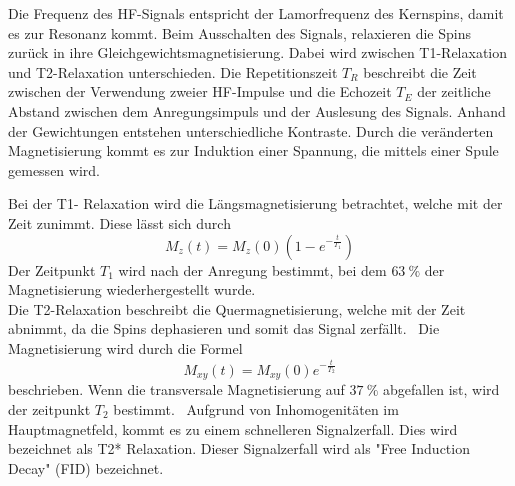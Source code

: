 Die Frequenz des HF-Signals entspricht der Lamorfrequenz des Kernspins, damit es zur Resonanz kommt. 
Beim Ausschalten des Signals, relaxieren die Spins zurück in ihre Gleichgewichtsmagnetisierung. 
Dabei wird zwischen T1-Relaxation und T2-Relaxation unterschieden. 
Die Repetitionszeit $T_R$ beschreibt die Zeit zwischen der Verwendung zweier HF-Impulse und die Echozeit $T_E$ der zeitliche Abstand zwischen dem Anregungsimpuls und der Auslesung des Signals. 
Anhand der Gewichtungen entstehen unterschiedliche Kontraste.
Durch die veränderten Magnetisierung kommt es zur Induktion einer Spannung, die mittels einer Spule gemessen wird.~\cite{Pollmann}

Bei der T1- Relaxation wird die Längsmagnetisierung betrachtet, welche mit der Zeit zunimmt.
Diese lässt sich durch 
\begin{equation}
    M_z(t) = M_z(0) (1 - e^{-\frac{t}{T_1}})
\end{equation}
Der Zeitpunkt $T_1$ wird nach der Anregung bestimmt, bei dem $\qty{63}{\%}$ der Magnetisierung wiederhergestellt wurde.~\cite{Pollmann}\\
Die T2-Relaxation beschreibt die Quermagnetisierung, welche mit der Zeit abnimmt, da die Spins dephasieren und somit das Signal zerfällt.~\cite{Dössel}
Die Magnetisierung wird durch die Formel
\begin{equation}
    M_{xy}(t) = M_{xy}(0) e^{-\frac{t}{T_2}} 
\end{equation}
beschrieben.
Wenn die transversale Magnetisierung auf $\qty{37}{\%}$ abgefallen ist, wird der zeitpunkt $T_2$ bestimmt.~\cite{Pollmann}
Aufgrund von Inhomogenitäten im Hauptmagnetfeld, kommt es zu einem schnelleren Signalzerfall. Dies wird bezeichnet als T2* Relaxation.
Dieser Signalzerfall wird als "Free Induction Decay" (FID) bezeichnet.~\cite{Dössel}\\

